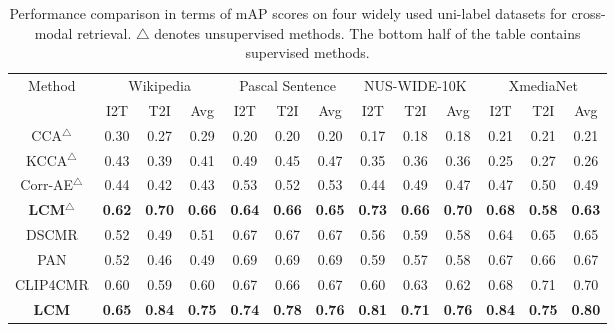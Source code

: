 \begin{table}
\centering
\caption{{Performance comparison in terms of mAP scores on four widely used uni-label datasets for cross-modal retrieval. $\triangle$ denotes unsupervised methods. 
The bottom half of the table contains supervised methods.}}
  \label{tab:sota_big}
\setlength{\tabcolsep}{5pt}
  \begin{tabular}{c|ccc|ccc|ccc|ccc}
    \toprule
     Method & \multicolumn{3}{c|}{Wikipedia} & \multicolumn{3}{c|}{Pascal Sentence} & \multicolumn{3}{c|}{NUS-WIDE-10K} &\multicolumn{3}{c}{XmediaNet}\\
     & I2T & T2I & Avg & I2T & T2I & Avg & I2T & T2I & Avg & I2T & T2I & Avg\\
     \midrule
     CCA$^\triangle$ \cite{cca} & 0.30 & 0.27 & 0.29 & 0.20 & 0.20 & 0.20 & 0.17 & 0.18 & 0.18 & 0.21 & 0.21 & 0.21 \\
     KCCA$^\triangle$ \cite{KCCA} & 0.43 & 0.39 & 0.41 & 0.49 & 0.45 & 0.47 & 0.35 & 0.36 & 0.36 & 0.25 & 0.27 & 0.26\\
     Corr-AE$^\triangle$ \cite{corr-ae} & 0.44 & 0.42 & 0.43 & 0.53 & 0.52 & 0.53 & 0.44 & 0.49 & 0.47 & 0.47 & 0.50 & 0.49 \\
     \textbf{LCM$^\triangle$} & \textbf{0.62} & \textbf{0.70} & \textbf{0.66} & \textbf{0.64} & \textbf{0.66} & \textbf{0.65} & \textbf{0.73} & \textbf{0.66} & \textbf{0.70} & \textbf{0.68} & \textbf{0.58} & \textbf{0.63}\\
     \bottomrule
     
     DSCMR \cite{dscmr} & 0.52 & 0.49 & 0.51 & 0.67 & 0.67 & 0.67 & 0.56 & 0.59 & 0.58 & 0.64 & 0.65 & 0.65 \\
     PAN \cite{pan} & 0.52 & 0.46 & 0.49 & 0.69 & 0.69 & 0.69 & 0.59 & 0.57 & 0.58 & 0.67 & 0.66 & 0.67 \\
     CLIP4CMR \cite{clip4cmr} & 0.60 & 0.59 & 0.60 & 0.67 & 0.66 & 0.67 & 0.60 & 0.63 & 0.62 & 0.68 & 0.71 & 0.70 \\
     \textbf{LCM} & \textbf{0.65} & \textbf{0.84} & \textbf{0.75} & \textbf{0.74} & \textbf{0.78} & \textbf{0.76} & \textbf{0.81} & \textbf{0.71} & \textbf{0.76} & \textbf{0.84} & \textbf{0.75} & \textbf{0.80}\\
  \bottomrule
\end{tabular}
\end{table}


